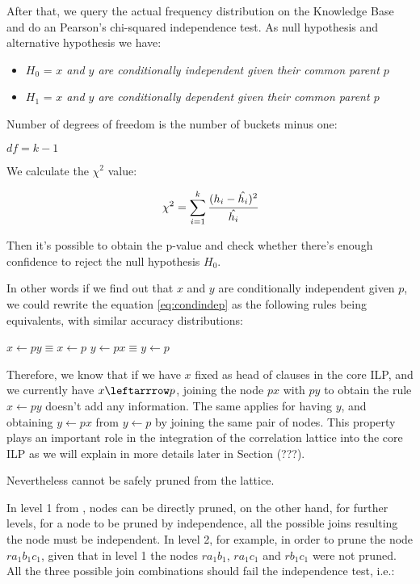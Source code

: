 After that, we query the actual frequency distribution on the Knowledge Base and do an Pearson's chi-squared
independence test. As null hypothesis and alternative hypothesis we have:

\begin{itemize}
 \item $H_0$ = \emph{$x$ and $y$ are conditionally independent given their common parent $p$}
 \item $H_1$ = \emph{$x$ and $y$ are conditionally dependent given their common parent $p$} 
\end{itemize}

Number of degrees of freedom is the number of buckets minus one:

\begin{center}
 $df=k-1$
\end{center}

We calculate the $\chi^2$ value:

\begin{equation}
 \chi^2=\sum_{i=1}^{k} \cfrac{(h_i - \hat{h_i})^2}{\hat{h_i}}
\end{equation}

\cite{Jaroszewicz02pruningredundant}

Then it's possible to obtain the p-value and check whether there's enough confidence to reject the null hypothesis
$H_0$. 


In other words if we find out that $x$ and $y$ are conditionally independent given $p$, we could rewrite the equation
\ref{eq:condindep} as the following rules being equivalents, with similar accuracy distributions:

$x \leftarrow py \equiv x \leftarrow p$
$y \leftarrow px \equiv y \leftarrow p$

Therefore, we know that if we have $x$ fixed as head of clauses in the core ILP, and we currently have $x \leftarrrow
p$, joining the node $px$ with $py$ to obtain the rule $x \leftarrow py$ doesn't add any information. The same applies
for having $y$, and obtaining $y \leftarrow px$ from $y \leftarrow p$ by joining the same pair of nodes. This property
plays an important role in the integration of the correlation lattice into the core ILP as we will explain in more
details later in Section (???).

Nevertheless cannot be safely pruned from the lattice.  


In level 1 from \graphname, nodes can be directly pruned, on the other hand, for further levels, for a node to be
pruned by independence, all the possible joins resulting the node must be independent. In level 2, for example, in order
to prune the node $r a_1 b_1 c_1$, given that in level 1 the nodes $r a_1 b_1$, $r a_1 c_1$ and $r b_1 c_1$ were not
pruned. All the three possible join combinations should fail the independence test, i.e.:


